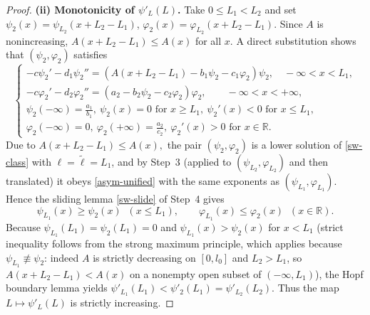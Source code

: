 \documentclass[reqno]{amsart}
\newcommand{\rev}[1]{#1}
\theoremstyle{plain}
\theoremstyle{definition}
\theoremstyle{remark}
\begin{document}
\begin{proof}
		\textbf{(ii) Monotonicity of $\psi'_L(L)$.}  
		Take $0\le L_1<L_2$ and set
		$\psi_2(x)=\psi_{L_2}(x+L_2-L_1)$, $\varphi_2(x)=\varphi_{L_2}(x+L_2-L_1)$.
		Since $A$ is nonincreasing, $A(x+L_2-L_1)\le A(x)$ for all $x$.  
		A direct substitution shows that $(\psi_2,\varphi_2)$ satisfies
		\[
		\begin{cases}
			-c \psi_2' - d_1 \psi_2'' = (A(x + L_2 - L_1) - b_1\psi_2 - c_1\varphi_2)\psi_2, \quad-\infty < x < L_1,\\
			-c \varphi_2' - d_2 \varphi_2'' = (a_2 - b_2\psi_2 - c_2\varphi_2)\varphi_2, \qquad -\infty < x < +\infty,\\
			\psi_2(-\infty) = \frac{a_1}{b_1}, ~ \psi_2(x)=0 \text{ for } x\ge L_1, ~ \psi_2'(x)<0 \text{ for } x\le L_1,\\	
			\varphi_2(-\infty) = 0, ~ \varphi_2(+\infty)=\frac{a_2}{c_2}, ~ \varphi_2'(x)>0 \text{ for } x\in\mathbb{R}.
		\end{cases}	
		\]
		Due to $A(x + L_2 - L_1) \leq A(x),$ \rev{the pair $(\psi_2,\varphi_2)$ is a
		lower solution of \eqref{sw-class} with $\ell=\tilde\ell=L_1$, and by Step~3
		(applied to $(\psi_{L_2},\varphi_{L_2})$ and then translated) it obeys
		\eqref{asym-unified} with the same exponents as $(\psi_{L_1},\varphi_{L_1})$.
		Hence the sliding lemma \eqref{sw-slide} of Step~4 gives}
		\[
		\psi_{L_1}(x)\ge \psi_2(x)\;\;(x\le L_1),\qquad
		\varphi_{L_1}(x)\le \varphi_2(x)\;\;(x\in\mathbb{R}).
		\]
		Because $\psi_{L_1}(L_1)=\psi_2(L_1)=0$ and $\psi_{L_1}(x)>\psi_2(x)$ for
		$x<L_1$ (strict inequality follows from the strong maximum principle\rev{,
		which applies because $\psi_{L_1}\not\equiv\psi_2$: indeed $A$ is strictly
		decreasing on $[0,l_0]$ and $L_2>L_1$, so $A(x+L_2-L_1)<A(x)$ on a nonempty
		open subset of $(-\infty,L_1)$}), the
		Hopf boundary lemma yields $\psi'_{L_1}(L_1)<\psi'_2(L_1)=\psi'_{L_2}(L_2)$.
		Thus the map $L\mapsto\psi'_L(L)$ is strictly increasing.
		

\end{proof}
\end{document}
